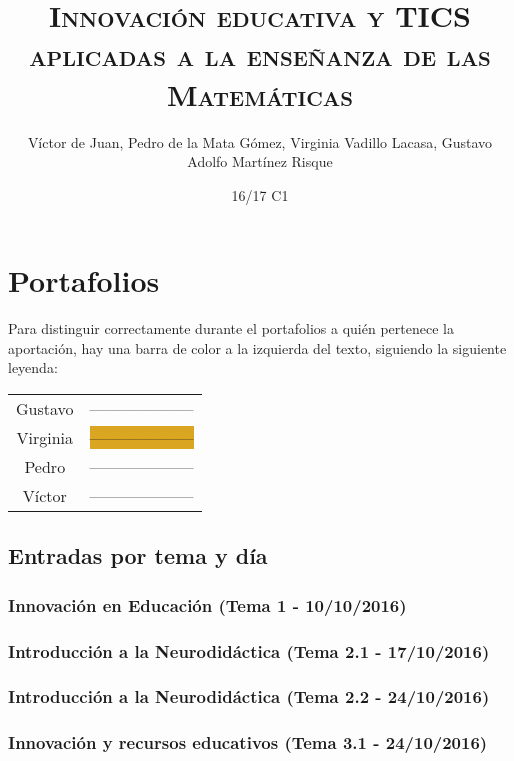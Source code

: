 \documentclass[palatino,nochap,miniheader]{apuntesURJC}
\title{\textsc{Innovación educativa y TICS aplicadas a la enseñanza de las Matemáticas}}
\author{Víctor de Juan,
Pedro de la Mata Gómez,
Virginia Vadillo Lacasa,
Gustavo Adolfo Martínez Risque}
\date{16/17 C1}
\newcommand{\guscolor}{OliveGreen}
\newcommand{\virgicolor}{Goldenrod}
\newcommand{\pedrocolor}{NavyBlue}
\newcommand{\victorcolor}{Bittersweet}
\begin{document}
\pagestyle{plain}
\maketitle

\tableofcontents
\newpage

\chapter{Portafolios}

Para distinguir correctamente durante el portafolios a quién pertenece la aportación, hay una barra de color a la izquierda del texto, siguiendo la siguiente leyenda:

\begin{table}[h!]
\centering
\begin{tabular}{|c|c|}
\hline
Gustavo & \colorbox{\guscolor}{--------------------}\\
Virginia & \colorbox{\virgicolor}{--------------------}\\
Pedro & \colorbox{\pedrocolor}{--------------------}\\
Víctor & \colorbox{\victorcolor}{--------------------}\\\hline
\end{tabular}
\end{table}

\section{Entradas por tema y día}

\subsection{Innovación en Educación (Tema 1 - 10/10/2016)}


\subsection{Introducción a la Neurodidáctica (Tema 2.1 - 17/10/2016)}


\subsection{Introducción a la Neurodidáctica (Tema 2.2 - 24/10/2016)}


\subsection{Innovación y recursos educativos (Tema 3.1 - 24/10/2016)}

\end{document}
